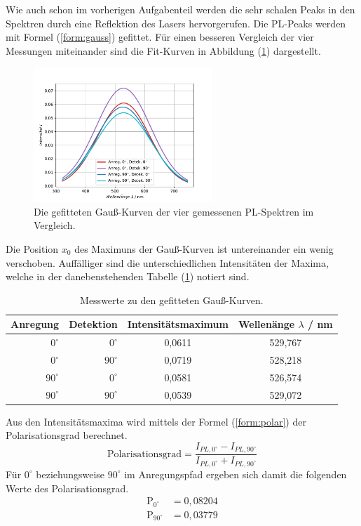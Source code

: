 Wie auch schon im vorherigen Aufgabenteil werden die sehr schalen Peaks in den Spektren durch eine Reflektion des Lasers hervorgerufen.
Die PL-Peaks werden mit Formel (\ref{form:gauss}) gefittet.
F\"{u}r einen besseren Vergleich der vier Messungen miteinander sind die Fit-Kurven in Abbildung (\ref{abb:auf3_vergleich}) dargestellt.
\begin{figure}[hbtp]
\centering
	\includegraphics[width=0.6\textwidth]{Plots/aufgabe3_vergleich.pdf}
	\caption{Die gefitteten Gau{\ss}-Kurven der vier gemessenen PL-Spektren im Vergleich.}
	\label{abb:auf3_vergleich}
\end{figure}
Die Position $x_0$ des Maximuns der Gau{\ss}-Kurven ist untereinander ein wenig verschoben.
Auff\"{a}lliger sind die unterschiedlichen Intensit\"{a}ten der Maxima, welche in der danebenstehenden Tabelle (\ref{tab:auf3_vergleich}) notiert sind.
\begin{table}
\centering
\caption{Messwerte zu den gefitteten Gau{\ss}-Kurven.}
	\begin{tabular}{|rrcc|}
	\hline
	{Anregung} & {Detektion} & {Intensit\"{a}tsmaximum} & {Wellen\"{a}nge $\lambda$ / nm}\\
	\hline
	$0^{\circ}$ & $0^{\circ}$ & 0,0611 & 529,767 \\
	$0^{\circ}$ & $90^{\circ}$ & 0,0719 & 528,218\\
	$90^{\circ}$ & $0^{\circ}$ & 0,0581 & 526,574\\
	$90^{\circ}$ & $90^{\circ}$ & 0,0539 & 529,072\\
	\hline
\end{tabular}
\label{tab:auf3_vergleich}
\end{table}
Aus den Intensit\"{a}tsmaxima wird mittels der Formel (\ref{form:polar}) der Polarisationsgrad berechnet.
\begin{equation}
	\text{Polarisationsgrad} = \frac{I_{PL,0^{\circ}} - I_{PL,90^{\circ}}}{I_{PL,0^{\circ}} + I_{PL,90^{\circ}}}
	\label{form:polar}
\end{equation}
F\"{u}r $0^{\circ}$ beziehungsweise $90^{\circ}$ im Anregungspfad ergeben sich damit die folgenden Werte des Polarisationsgrad.
\begin{align*}
	\text{P}_{0^{\circ}} &= 0,08204 \\
	\text{P}_{90^{\circ}} &= 0,03779 \\	
\end{align*}

